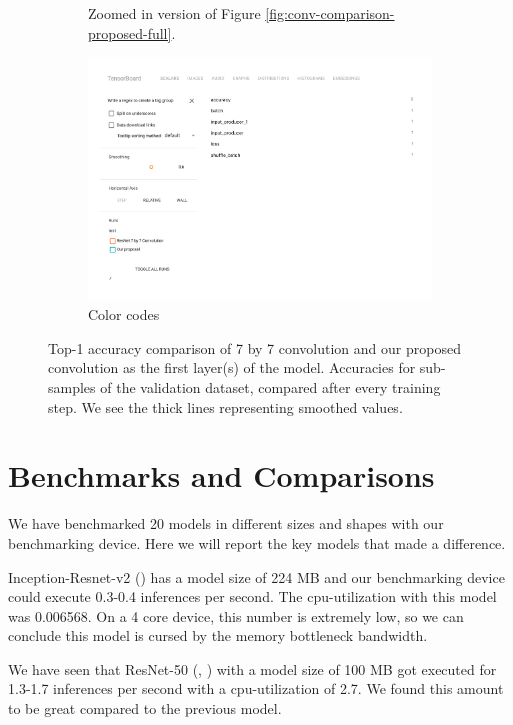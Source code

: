 \begin{figure}[!h]
\begin{subfigure}{.79\textwidth}
        \caption{Zoomed in version of Figure \ref{fig:conv-comparison-proposed-full}.}
  \end{subfigure}
  \begin{subfigure}{.49\textwidth}
        \includegraphics[width=1\linewidth]{images/proposed_conv_legend.pdf}
        \caption{Color codes}
  \end{subfigure}
  \caption{Top-1 accuracy comparison of 7 by 7 convolution and our proposed convolution as the first layer(s) of the model. Accuracies for sub-samples of the validation dataset, compared after every training step. We see the thick lines representing smoothed values.}
  \label{fig:proposed-comparison}
\end{figure}
\fi


\section{Benchmarks and Comparisons}
We have benchmarked 20 models in different sizes and shapes with our benchmarking device. Here we will report the key models that made a difference.

Inception-Resnet-v2 (\cite{DBLP:journals/corr/SzegedyIV16}) has a model size of 224 MB and our benchmarking device could execute 0.3-0.4 inferences per second. The cpu-utilization with this model was 0.006568. On a 4 core device, this number is extremely low, so we can conclude this model is cursed by the memory bottleneck bandwidth. 

We have seen that ResNet-50 (\cite{He:2015aa}, \cite{he2016identity}) with a model size of 100 MB got executed for 1.3-1.7 inferences per second with a cpu-utilization of 2.7. We found this amount to be great compared to the previous model.  

